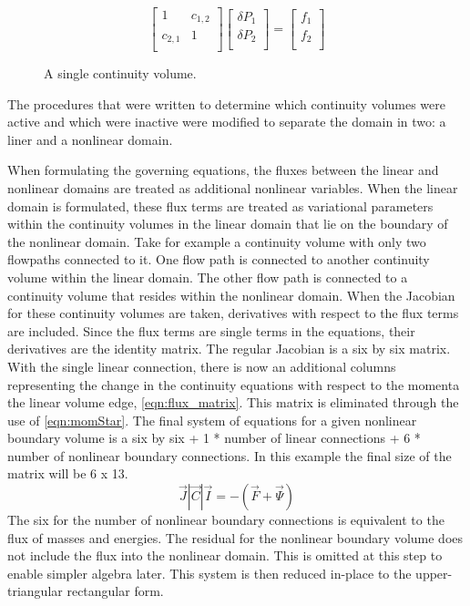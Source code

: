   \begin{equation}
\label{eqn:domainDecomp5}
 \begin{bmatrix} 
1 & c_{1,2}  \\
c_{2,1} & 1 \\
 \end{bmatrix} \begin{bmatrix}
 \delta P_{1} \\
 \delta P_{2} \\
\end{bmatrix}  = \begin{bmatrix}
 f_1 \\
 f_2 \\
\end{bmatrix}
 \end{equation}
 

\begin{figure}[ht]
\centering

\caption{A single continuity volume.}
\label{fig:single3dvol}
\end{figure}




The procedures that were written to determine which continuity volumes were active and which were inactive were modified to separate the domain in two: a liner and a nonlinear domain.

When formulating the governing equations, the fluxes between the linear and nonlinear domains are treated as additional nonlinear variables.
When the linear domain is formulated, these flux terms are treated as variational parameters within the continuity volumes in the linear domain that lie on the boundary of the nonlinear domain.
Take for example a continuity volume with only two flowpaths connected to it.
One flow path is connected to another continuity volume within the linear domain.
The other flow path is connected to a continuity volume that resides within the nonlinear domain.
When the Jacobian for these continuity volumes are taken, derivatives with respect to the flux terms are included.
Since the flux terms are single terms in the equations, their derivatives are the identity matrix.
The regular Jacobian is a six by six matrix.
With the single linear connection, there is now an additional columns representing the change in the continuity equations with respect to the momenta the linear volume edge, \eqref{eqn:flux_matrix}.
This matrix is eliminated through the use of \eqref{eqn:momStar}.
The final system of equations for a given nonlinear boundary volume is a six by six + 1 * number of linear connections + 6 * number of nonlinear boundary connections.
In this example the final size of the matrix will be 6 x 13.
\begin{equation}
\vec{J}|\vec{C}|\vec{I} = -(\vec{F} + \vec{\Psi})
\end{equation}
The six for the number of nonlinear boundary connections is equivalent to the flux of masses and energies.
The residual for the nonlinear boundary volume does not include the flux into the nonlinear domain.
This is omitted at this step to enable simpler algebra later.
This system is then reduced in-place to the upper-triangular rectangular form. 

